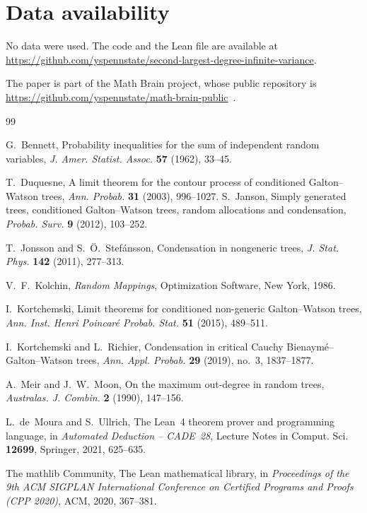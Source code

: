 \documentclass[11pt]{amsart}
\numberwithin{equation}{section}
\begin{document}
\section*{Data availability}
No data were used. The code and the Lean file are available at\\ \url{https://github.com/yspennstate/second-largest-degree-infinite-variance}.

The paper is part of the Math Brain project, whose public repository is \url{https://github.com/yspennstate/math-brain-public}~\cite{MathBrainRepo}.

\begin{thebibliography}{99}

G.~Bennett, Probability inequalities for the sum of independent random variables, \emph{J. Amer. Statist. Assoc.} \textbf{57} (1962), 33--45.

T.~Duquesne, A limit theorem for the contour process of conditioned Galton--Watson trees, \emph{Ann. Probab.} \textbf{31} (2003), 996--1027.
S.~Janson, Simply generated trees, conditioned Galton--Watson trees, random allocations and condensation, \emph{Probab. Surv.} \textbf{9} (2012), 103--252.

T.~Jonsson and S.~\"O.~Stef\'ansson, Condensation in nongeneric trees, \emph{J. Stat. Phys.} \textbf{142} (2011), 277--313.

V.~F.~Kolchin, \emph{Random Mappings}, Optimization Software, New York, 1986.

I.~Kortchemski, Limit theorems for conditioned non-generic Galton--Watson trees, \emph{Ann. Inst. Henri Poincar\'e Probab. Stat.} \textbf{51} (2015), 489--511.

I.~Kortchemski and L.~Richier, Condensation in critical Cauchy Bienaym\'e--Galton--Watson trees, \emph{Ann. Appl. Probab.} \textbf{29} (2019), no.~3, 1837--1877.

A.~Meir and J.~W.~Moon, On the maximum out-degree in random trees, \emph{Australas. J. Combin.} \textbf{2} (1990), 147--156.

L.~de~Moura and S.~Ullrich, The Lean~4 theorem prover and programming language, in \emph{Automated Deduction -- CADE~28}, Lecture Notes in Comput. Sci. \textbf{12699}, Springer, 2021, 625--635.

The mathlib Community, The Lean mathematical library, in \emph{Proceedings of the 9th ACM SIGPLAN International Conference on Certified Programs and Proofs (CPP 2020)}, ACM, 2020, 367--381.


\end{thebibliography}
\end{document}
